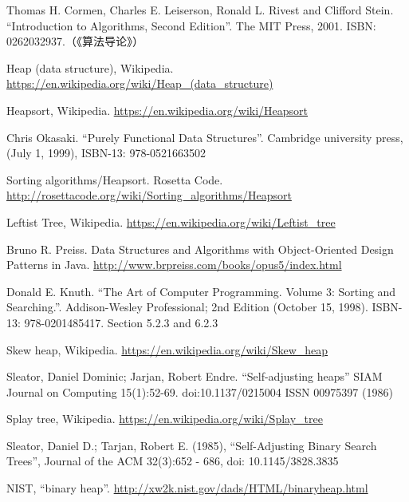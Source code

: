 \documentclass[b5paper]{ctexart}
\begin{document}
\begin{thebibliography}{99}

Thomas H. Cormen, Charles E. Leiserson, Ronald L. Rivest and Clifford Stein. ``Introduction to Algorithms, Second Edition''. The MIT Press, 2001. ISBN: 0262032937.（《算法导论》）

Heap (data structure), Wikipedia. \url{https://en.wikipedia.org/wiki/Heap_(data_structure)}

Heapsort, Wikipedia. \url{https://en.wikipedia.org/wiki/Heapsort}

Chris Okasaki. ``Purely Functional Data Structures''. Cambridge university press, (July 1, 1999), ISBN-13: 978-0521663502

Sorting algorithms/Heapsort. Rosetta Code. \url{http://rosettacode.org/wiki/Sorting_algorithms/Heapsort}

Leftist Tree, Wikipedia. \url{https://en.wikipedia.org/wiki/Leftist_tree}

Bruno R. Preiss. Data Structures and Algorithms with Object-Oriented Design Patterns in Java. \url{http://www.brpreiss.com/books/opus5/index.html}

Donald E. Knuth. ``The Art of Computer Programming. Volume 3: Sorting and Searching.''. Addison-Wesley Professional;
2nd Edition (October 15, 1998). ISBN-13: 978-0201485417. Section 5.2.3 and 6.2.3

Skew heap, Wikipedia. \url{https://en.wikipedia.org/wiki/Skew_heap}

Sleator, Daniel Dominic; Jarjan, Robert Endre. ``Self-adjusting heaps'' SIAM Journal on Computing 15(1):52-69. doi:10.1137/0215004 ISSN 00975397 (1986)

Splay tree, Wikipedia. \url{https://en.wikipedia.org/wiki/Splay_tree}

Sleator, Daniel D.; Tarjan, Robert E. (1985), ``Self-Adjusting Binary Search Trees'', Journal of the ACM 32(3):652 - 686, doi: 10.1145/3828.3835

NIST, ``binary heap''. \url{http://xw2k.nist.gov/dads/HTML/binaryheap.html}

\end{thebibliography}

\expandafter\enddocument
\fi
\end{document}
